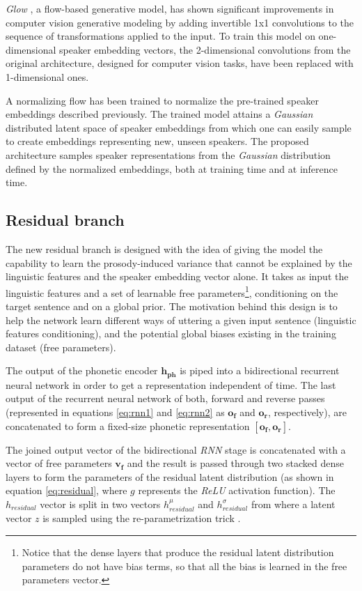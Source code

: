 \textit{Glow} \autocite{kingma2018}, a flow-based generative model, has shown significant improvements in computer vision generative modeling by adding invertible 1x1 convolutions to the sequence of transformations applied to the input. To train this model on one-dimensional speaker embedding vectors, the 2-dimensional convolutions from the original architecture, designed for computer vision tasks, have been replaced with 1-dimensional ones.

A normalizing flow has been trained to normalize the pre-trained speaker embeddings described previously. The trained model attains a \textit{Gaussian} distributed latent space of speaker embeddings from which one can easily sample to create embeddings representing new, unseen speakers. The proposed architecture samples speaker representations from the \textit{Gaussian} distribution defined by the normalized embeddings, both at training time and at inference time.


\subsection{Residual branch}
The new residual branch is designed with the idea of giving the model the capability to learn the prosody-induced variance that cannot be explained by the linguistic features and the speaker embedding vector alone. It takes as input the linguistic features and a set of learnable free parameters\footnote{Notice that the dense layers that produce the residual latent distribution parameters do not have bias terms, so that all the bias is learned in the free parameters vector.}, conditioning on the target sentence and on a global prior. The motivation behind this design is to help the network learn different ways of uttering a given input sentence (linguistic features conditioning), and the potential global biases existing in the training dataset (free parameters).

The output of the phonetic encoder $\mathbf{h_{\text{ph}}}$ is piped into a bidirectional recurrent neural network \autocite{schuster1997,graves2005} in order to get a representation independent of time. The last output of the recurrent neural network of both, forward and reverse passes (represented in equations \ref{eq:rnn1} and \ref{eq:rnn2} as $\mathbf{o_f}$ and $\mathbf{o_r}$, respectively), are  concatenated to form a fixed-size phonetic representation $[\mathbf{o_f}, \mathbf{o_r}]$. 

The joined output vector of the bidirectional \textit{RNN} stage is concatenated with a vector of free parameters $\mathbf{v_f}$ and the result is passed through two stacked dense layers to form the parameters of the residual latent distribution (as shown in equation \ref{eq:residual}, where $g$ represents the \textit{ReLU} activation function). The $h_{residual}$ vector is split in two vectors $h_{residual}^{\mu}$ and $h_{residual}^{\sigma}$ from where a latent vector $z$ is sampled using the re-parametrization trick \autocite{kingma2019}. 


